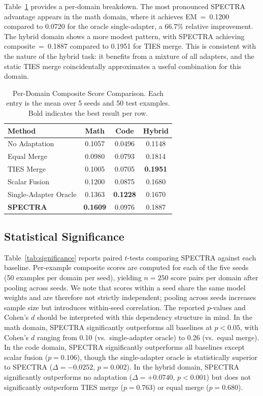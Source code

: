 \documentclass[preprint,12pt]{elsarticle}
\begin{document}
Table~\ref{tab:per_domain} provides a per-domain breakdown. The most
pronounced SPECTRA advantage appears in the math domain, where it achieves
EM~=~0.1200 compared to 0.0720 for the oracle single-adapter, a 66.7\% relative
improvement. The hybrid domain shows a more modest pattern, with SPECTRA
achieving composite~=~0.1887 compared to 0.1951 for TIES merge. This is
consistent with the nature of the hybrid task: it benefits from a mixture of
all adapters, and the static TIES merge coincidentally approximates a useful
combination for this domain.

\begin{table}[t]
\centering
\caption{Per-Domain Composite Score Comparison. Each entry is the mean over 5 seeds and 50 test examples. Bold indicates the best result per row.}
\label{tab:per_domain}
\begin{tabular}{lccc}
\toprule
\textbf{Method} & \textbf{Math} & \textbf{Code} & \textbf{Hybrid} \\
\midrule
No Adaptation        & 0.1057 & 0.0496 & 0.1148 \\
Equal Merge          & 0.0980 & 0.0793 & 0.1814 \\
TIES Merge           & 0.1005 & 0.0705 & \textbf{0.1951} \\
Scalar Fusion        & 0.1200 & 0.0875 & 0.1680 \\
Single-Adapter Oracle & 0.1363 & \textbf{0.1228} & 0.1670 \\
\textbf{SPECTRA}     & \textbf{0.1609} & 0.0976 & 0.1887 \\
\bottomrule
\end{tabular}
\end{table}

\subsection{Statistical Significance}
\label{subsec:significance}

Table~\ref{tab:significance} reports paired $t$-tests comparing SPECTRA against
each baseline. Per-example composite scores are computed for each of the five
seeds (50 examples per domain per seed), yielding $n = 250$ score pairs per
domain after pooling across seeds. We note that scores within a seed share the
same model weights and are therefore not strictly independent; pooling across
seeds increases sample size but introduces within-seed correlation. The reported
$p$-values and Cohen's $d$ should be interpreted with this dependency structure
in mind. In the math domain, SPECTRA significantly outperforms all baselines at
$p < 0.05$, with Cohen's $d$ ranging from 0.10 (vs.\ single-adapter oracle) to
0.26 (vs.\ equal merge). In the code domain, SPECTRA significantly outperforms
all baselines except scalar fusion ($p = 0.106$), though the single-adapter
oracle is statistically superior to SPECTRA ($\Delta = -0.0252$, $p = 0.002$).
In the hybrid domain, SPECTRA significantly outperforms no adaptation
($\Delta = +0.0740$, $p < 0.001$) but does not significantly outperform TIES
merge ($p = 0.763$) or equal merge ($p = 0.680$).
\end{document}
